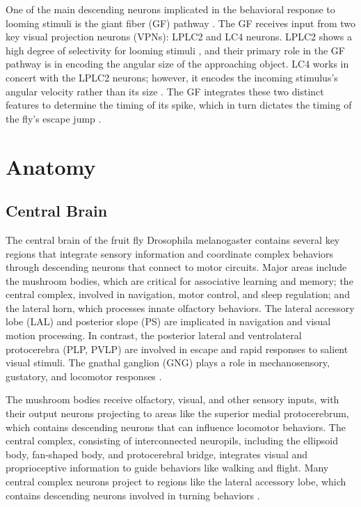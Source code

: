 \documentclass[../main/thesis_msc.tex]{subfiles}
\begin{document}
	One of the main descending neurons implicated in the behavioral response to looming stimuli is the giant fiber (GF) pathway \autocite{card_visually_2008}. The GF receives input from two key visual projection neurons (VPNs): LPLC2 and LC4 neurons. LPLC2 shows a high degree of selectivity for looming stimuli \autocite{ache_neural_2019,klapoetke_ultra-selective_2017}, and their primary role in the GF pathway is in encoding the angular size of the approaching object. LC4 works in concert with the LPLC2 neurons; however, it encodes the incoming stimulus's angular velocity rather than its size \autocite{ache_neural_2019}. The GF integrates these two distinct features to determine the timing of its spike, which in turn dictates the timing of the fly’s escape jump \autocite{ache_state-dependent_2019,von_reyn_spike-timing_2014, jang_azimuthal_2023}.

	\section{Anatomy}
	\subsection{Central Brain}
	The central brain of the fruit fly Drosophila melanogaster contains several key regions that integrate sensory information and coordinate complex behaviors through descending neurons that connect to motor circuits. Major areas include the mushroom bodies, which are critical for associative learning and memory; the central complex, involved in navigation, motor control, and sleep regulation; and the lateral horn, which processes innate olfactory behaviors. The lateral accessory lobe (LAL) and posterior slope (PS) are implicated in navigation and visual motion processing. In contrast, the posterior lateral and ventrolateral protocerebra (PLP, PVLP) are involved in escape and rapid responses to salient visual stimuli. The gnathal ganglion (GNG) plays a role in mechanosensory, gustatory, and locomotor responses \autocite{namiki_functional_2018}.

	The mushroom bodies receive olfactory, visual, and other sensory inputs, with their output neurons projecting to areas like the superior medial protocerebrum, which contains descending neurons that can influence locomotor behaviors. The central complex, consisting of interconnected neuropils, including the ellipsoid body, fan-shaped body, and protocerebral bridge, integrates visual and proprioceptive information to guide behaviors like walking and flight. Many central complex neurons project to regions like the lateral accessory lobe, which contains descending neurons involved in turning behaviors \autocite{scheffer_connectome_2020}.
\end{document}
